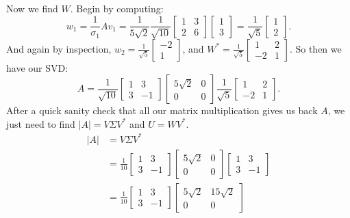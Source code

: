 \documentclass{article}
\begin{document}
\begin{enumerate}
\begin{enumerate}[label= (\alph*)]
    Now we find $W$. Begin by computing: 
    \[
        w_1=\frac{1}{\sigma_1}Av_1=\frac{1}{5\sqrt{2} }\frac{1}{\sqrt{10} }\begin{bmatrix} 1&3\\2&6 \end{bmatrix} \begin{bmatrix} 1\\3 \end{bmatrix} =\frac{1}{\sqrt{5} }\begin{bmatrix} 1\\2 \end{bmatrix} 
    .\] 
        And again by inspection, $w_2=\frac{1}{\sqrt{5} }\begin{bmatrix} -2\\1 \end{bmatrix} $, and $W^* =\frac{1}{\sqrt{5} }\begin{bmatrix} 1&2\\-2&1 \end{bmatrix} $. So then we have our SVD:
    \[
        A=\frac{1}{\sqrt{10} }\begin{bmatrix} 1&3\\3&-1 \end{bmatrix} \begin{bmatrix} 5\sqrt{2} &0\\0&0 \end{bmatrix} \frac{1}{\sqrt{5} }\begin{bmatrix} 1&2\\-2&1 \end{bmatrix} 
    .\] 
    After a quick sanity check that all our matrix multiplication gives us back $A$, we just need to find $|A|=V\Sigma V^* $ and $U=WV^* $.
    \begin{align*}
        |A|&=V\Sigma V^* \\
           &=\frac{1}{10}\begin{bmatrix} 1&3\\3&-1 \end{bmatrix} \begin{bmatrix} 5\sqrt{2} &0\\0&0 \end{bmatrix} \begin{bmatrix} 1&3\\3&-1 \end{bmatrix} \\
           &=\frac{1}{10}\begin{bmatrix} 1&3\\3&-1 \end{bmatrix} \begin{bmatrix} 5\sqrt{2} &15\sqrt{2} \\0&0 \end{bmatrix} \\

\end{align*}
\end{enumerate}
\end{enumerate}
\end{document}
